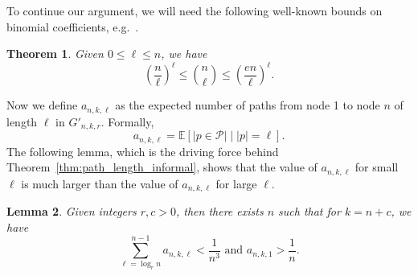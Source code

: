 \documentclass[11pt]{article}
\numberwithin{equation}{section}
\numberwithin{figure}{section}
\theoremstyle{plain}
\newtheorem{theorem}{Theorem}[section]
\newtheorem{lemma}[theorem]{Lemma}
\theoremstyle{definition}
\begin{document}
To continue our argument, we will need the following well-known
bounds on binomial coefficients, e.g.\ \cite{stanica2001good}.

\begin{theorem} \label{thm:binomial}
Given $0\leq \ell\leq n$, we have
\begin{equation*}
    \left(\frac{n}{\ell}\right)^\ell \leq \binom{n}{\ell}
    \leq \left(\frac{en}{\ell}\right)^\ell.
\end{equation*}
\end{theorem}

Now we define $a_{n,k,\ell}$ as the expected number of paths
from node 1 to node $n$ of length $\ell$ in $G'_{n,k,r}$.
Formally,
\begin{equation*}
a_{n,k,\ell}=\mathbb{E}\left[\left|p\in\mathcal{P}\right|\mid |p|=\ell\right].
\end{equation*}
The following lemma, which is the driving force behind
Theorem~\ref{thm:path_length_informal}, shows that the value of
$a_{n,k,\ell}$ for small $\ell$ is much larger than 
the value of $a_{n,k,\ell}$ for large $\ell$.

\begin{lemma} \label{lem:a_nk}
Given integers $r, c>0$, 
then there exists $n$ such that for $k=n+c$, we have
\begin{equation*}
\sum_{\ell=\log_r n}^{n-1} a_{n,k,\ell} < \frac{1}{n^{3}}\text{  and  } 
a_{n,k,1}>\frac{1}{n}.
\end{equation*}
\end{lemma}
\end{document}

